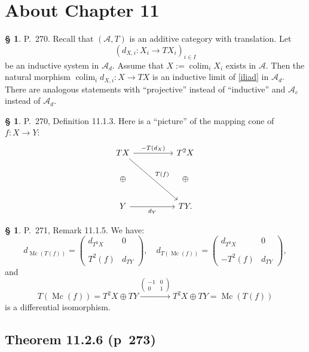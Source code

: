 \documentclass[12pt]{article}
\theoremstyle{remark}
\theoremstyle{definition}
\newtheorem{s}[thm]{\S}
\newcommand{\A}{\mathcal A}
\newcommand{\xr}{\xrightarrow}
\DeclareMathOperator*{\colim}{colim}
\DeclareMathOperator{\Mc}{Mc}
\begin{document}

\section{About Chapter 11}

\begin{s}
P.~270. Recall that $(\A,T)$ is an additive category with translation. Let 
\begin{equation}\label{iliad}
(d_{X,i}:X_i\to TX_i)_{i\in I}
\end{equation} 
be an inductive system in $\A_d$. Assume that $X:=\colim_iX_i$ exists in $\A$. Then the natural morphism $\colim_id_{X,i}:X\to TX$ is an inductive limit of \eqref{iliad} in $\A_d$. There are analogous statements with ``projective'' instead of ``inductive'' and $\A_c$ instead of $\A_d$.
\end{s}

%

\begin{s}
P.~270, Definition 11.1.3. Here is a ``picture'' of the mapping cone of $f:X\to Y$:
$$
\begin{tikzcd}
TX\ar{rr}{-T(d_X)}\ar{rrdd}{T(f)}&&T^2X\\ 
\oplus&&\oplus\\ 
Y\ar{rr}[swap]{d_Y}&&TY.
\end{tikzcd}
$$
\end{s}

%

\begin{s}
P.~271, Remark 11.1.5. We have:
$$
d_{\Mc(T(f))}=
\begin{pmatrix}
d_{T^2X}&0\\ \\ 
T^2(f)&d_{TY}
\end{pmatrix},\quad 
d_{T(\Mc(f))}=
\begin{pmatrix}
d_{T^2X}&0\\ \\ 
-T^2(f)&d_{TY}
\end{pmatrix},
$$ 
and 
$$
T(\Mc(f))=T^2X\oplus TY\xr{\begin{pmatrix}-1&0\\ 0&1\end{pmatrix}}T^2X\oplus TY=\Mc(T(f))
$$ 
is a differential isomorphism.
\end{s}


\subsection{Theorem 11.2.6 (p~273)} 
\end{document}
